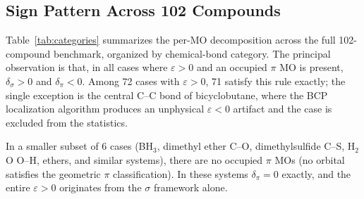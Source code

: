 \documentclass[11pt,a4paper]{article}
\newcommand{\delsg}{\delta_{\sigma}}
\newcommand{\delpi}{\delta_{\pi}}
\newcommand{\eps}{\varepsilon}
\begin{document}
\subsection{Sign Pattern Across 102 Compounds}
\label{sec:results_full}

Table~\ref{tab:categories} summarizes the per-MO decomposition
across the full 102-compound benchmark, organized by chemical-bond
category. The principal observation is that, in all cases where
$\eps > 0$ and an occupied $\pi$ MO is present, $\delsg > 0$ and
$\delpi < 0$. Among 72 cases with $\eps > 0$, 71 satisfy this rule
exactly; the single exception is the central C--C bond of bicyclobutane,
where the BCP localization algorithm produces an unphysical
$\eps < 0$ artifact and the case is excluded from the statistics.

In a smaller subset of 6 cases (BH$_3$, dimethyl ether C--O, dimethylsulfide
C--S, H$_2$O O--H, ethers, and similar systems), there are no
occupied $\pi$ MOs (no orbital satisfies the geometric $\pi$
classification). In these systems $\delpi = 0$ exactly, and the entire
$\eps > 0$ originates from the $\sigma$ framework alone.
\end{document}
